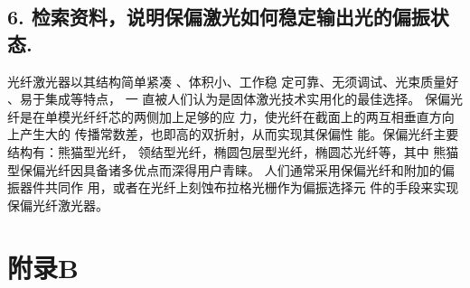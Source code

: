 \documentclass[10pt,a4paper,twoside,UTF8]{ctexart}
\begin{document}
\subsection*{6. 检索资料，说明保偏激光如何稳定输出光的偏振状态.}
光纤激光器以其结构简单紧凑 、体积小、工作稳
定可靠、无须调试、光束质量好 、易于集成等特点， 一
直被人们认为是固体激光技术实用化的最佳选择。
保偏光纤是在单模光纤纤芯的两侧加上足够的应
力，使光纤在截面上的两互相垂直方向上产生大的
传播常数差，也即高的双折射，从而实现其保偏性
能。保偏光纤主要结构有：熊猫型光纤，
领结型光纤，椭圆包层型光纤，椭圆芯光纤等，其中
熊猫型保偏光纤因具备诸多优点而深得用户青睐。
人们通常采用保偏光纤和附加的偏振器件共同作
用，或者在光纤上刻蚀布拉格光栅作为偏振选择元
件的手段来实现保偏光纤激光器。
\newpage
\section*{\LARGE 附录B}
\end{document}
